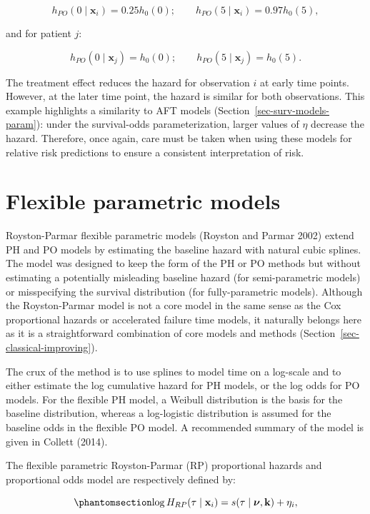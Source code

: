 \documentclass[
  letterpaper,
  krantz2]{style/krantz}
\begin{document}
\[
h_{PO}(0 \mid \mathbf{x}_i) =  0.25h_0(0); \quad\quad h_{PO}(5 \mid \mathbf{x}_i) =  0.97h_0(5),
\]

and for patient \(j\):

\[
h_{PO}(0 \mid \mathbf{x}_j) = h_0(0); \quad\quad h_{PO}(5 \mid \mathbf{x}_j) = h_0(5).
\]

The treatment effect reduces the hazard for observation \(i\) at early
time points. However, at the later time point, the hazard is similar for
both observations. This example highlights a similarity to AFT models
(Section~\ref{sec-surv-models-param}): under the survival-odds
parameterization, larger values of \(\eta\) decrease the hazard.
Therefore, once again, care must be taken when using these models for
relative risk predictions to ensure a consistent interpretation of risk.

\section{Flexible parametric models}\label{sec-flexible}

Royston-Parmar flexible parametric models (Royston and Parmar 2002)
extend PH and PO models by estimating the baseline hazard with natural
cubic splines.  The model was designed
to keep the form of the PH or PO methods but without estimating a
potentially misleading baseline hazard (for semi-parametric models) or
misspecifying the survival distribution (for fully-parametric models).
Although the Royston-Parmar model is not a core model in the same sense
as the Cox proportional hazards or accelerated failure time models, it
naturally belongs here as it is a straightforward combination of core
models and methods (Section~\ref{sec-classical-improving}).

The crux of the method is to use splines to model time on a log-scale
and to either estimate the log cumulative hazard for PH models, or the
log odds for PO models. For the flexible PH model, a Weibull
distribution is the basis for the baseline distribution, whereas a
log-logistic distribution is assumed for the baseline odds in the
flexible PO model.
A recommended summary of the model is given in Collett (2014).

The flexible parametric Royston-Parmar (RP) proportional hazards and
proportional odds model are respectively defined by:

\begin{equation}\phantomsection\label{eq-rp-hazard}{
\log{H}_{RP}(\tau \mid \mathbf{x}_i) = s(\tau \mid \boldsymbol{\nu},\mathbf{k}) + \eta_i,
}\end{equation}
\end{document}
